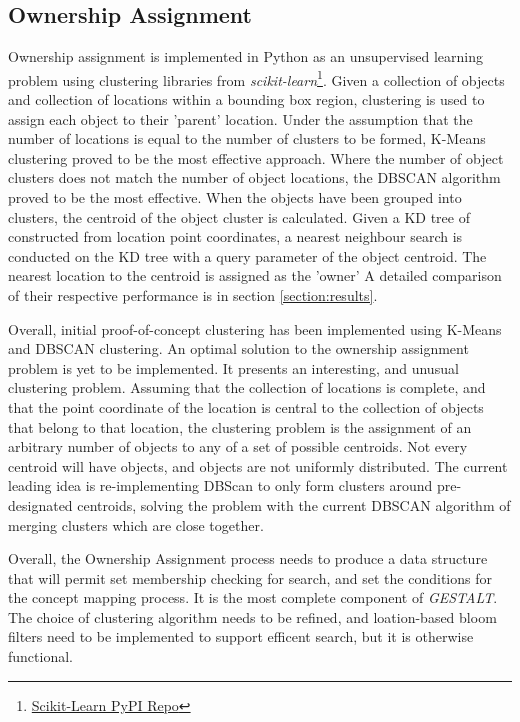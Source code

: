 \subsection{Ownership Assignment}
Ownership assignment is implemented in Python as an unsupervised learning problem using clustering libraries from \textit{scikit-learn}\footnote{\href{https://pypi.org/project/scikit-learn/}{Scikit-Learn PyPI Repo}}. 
Given a collection of objects and collection of locations within a bounding box region, clustering is used to assign each object to their 'parent' location. 
Under the assumption that the number of locations is equal to the number of clusters to be formed, K-Means clustering proved to be the most effective approach. 
Where the number of object clusters does not match the number of object locations, the DBSCAN algorithm proved to be the most effective. 
When the objects have been grouped into clusters, the centroid of the object cluster is calculated. Given a KD tree of constructed from location point coordinates, a nearest neighbour search is conducted on the KD tree with a query parameter of the object centroid. The nearest location to the centroid is assigned as the 'owner'
A detailed comparison of their respective performance is in section \ref{section:results}. 

Overall, initial proof-of-concept clustering has been implemented using K-Means and DBSCAN clustering. An optimal solution to the ownership assignment problem is yet to be implemented. 
It presents an interesting, and unusual clustering problem. 
Assuming that the collection of locations is complete, and that the point coordinate of the location is central to the collection of objects that belong to that location, the clustering problem is the assignment of an arbitrary number of objects to any of a set of possible centroids. Not every centroid will have objects, and objects are not uniformly distributed. The current leading idea is re-implementing DBScan to only form clusters around pre-designated centroids, solving the problem with the current DBSCAN algorithm of merging clusters which are close together. 

Overall, the Ownership Assignment process needs to produce a data structure that will permit set membership checking for search, and set the conditions for the concept mapping process. It is the most complete component of \textit{GESTALT}. The choice of clustering algorithm needs to be refined, and loation-based bloom filters need to be implemented to support efficent search, but it is otherwise functional. 


